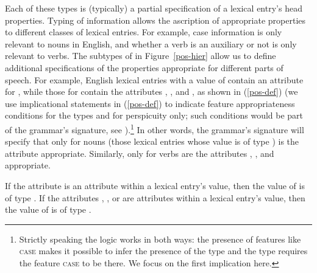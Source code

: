 \documentclass[output=paper
 	        ,biblatex
                ,babelshorthands
                ,newtxmath
                ,draftmode
                ,colorlinks, citecolor=brown
]{langscibook}
\begin{document}
Each of these types is (typically) a partial specification of a lexical entry's head properties.
Typing of  information allows the ascription of appropriate properties to different classes of lexical entries. For example, case information is only relevant to nouns in English, and whether a verb is an auxiliary or not is only relevant to verbs. 
The subtypes of  in Figure~\ref{pos-hier} allow us to define additional specifications of the properties appropriate for different parts of speech.
For example, English lexical entries with a  value of  contain an attribute for , while those for  contain the attributes , , and , as shown in (\ref{pos-def}) (we use implicational statements in (\ref{pos-def}) to indicate feature appropriateness conditions for the types  and  for perspicuity only; such conditions would be part of the grammar's signature, see \crossrefchaptert[\pageref{formal:page-signature}]{formal-background}).\footnote{%
Strictly speaking the logic works in both ways: the presence of features like \textsc{case} makes it possible to infer the presence of the type  and the type  requires the feature \textsc{case} to be there. We focus on the first implication here.
}
In other words, the grammar's signature will specify that only for nouns (those lexical entries whose  value is of type ) is the attribute  appropriate.
Similarly, only for verbs are the attributes , , and  appropriate.

\ealnoraggedright
\label{pos-def}
\ex\label{pos-def-a} 
If the attribute  is an attribute within a lexical entry's
 value, then the value of  is of type .  
\ex\label{pos-def-b} 
If the attributes , , or  are attributes within a lexical entry's
 value, then the value of  is of type .  
\zl
\end{document}

